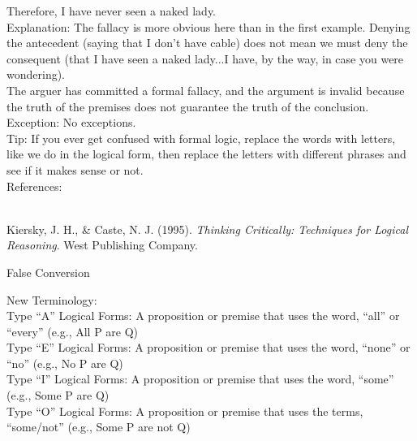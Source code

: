 \documentclass[a4paper,12pt,single,pdftex]{scrartcl}
\begin{document}
    
      Therefore, I have never seen a naked lady.
    \\

    
      Explanation: The fallacy is more obvious here than in the first example. Denying the antecedent (saying that I don’t have cable) does not mean we must deny the consequent (that I have seen a naked lady...I have, by the way, in case you were wondering).
    \\

    
      The arguer has committed a formal fallacy, and the argument is invalid because the truth of the premises does not guarantee the truth of the conclusion.
    \\

    
      Exception: No exceptions.
    \\

    
      Tip: If you ever get confused with formal logic, replace the words with letters, like we do in the logical form, then replace the letters with different phrases and see if it makes sense or not.
    \\

    References:

    
      
        
      \\

      
        
          Kiersky, J. H., \& Caste, N. J. (1995). {\it Thinking Critically: Techniques for Logical Reasoning}. West Publishing Company.
        
      
    
  

False Conversion
    
      New Terminology:
    \\

    
      Type “A” Logical Forms: A proposition or premise that uses the word, “all” or “every” (e.g., All P are Q)
    \\

    
      Type “E” Logical Forms: A proposition or premise that uses the word, “none” or “no” (e.g., No P are Q)
    \\

    
      Type “I” Logical Forms: A proposition or premise that uses the word, “some” (e.g., Some P are Q)
    \\

    
      Type “O” Logical Forms: A proposition or premise that uses the terms, “some/not” (e.g., Some P are not Q)
    \\
\end{document}
